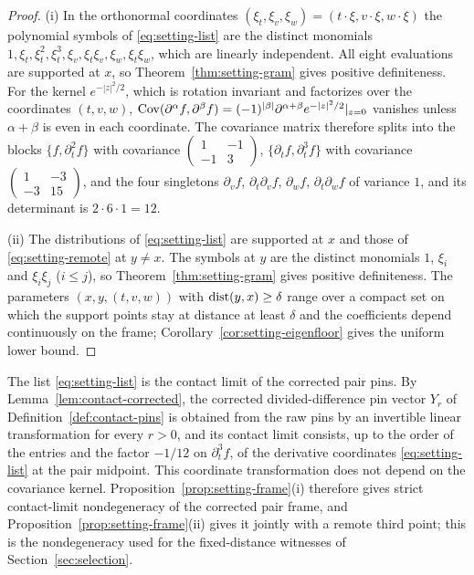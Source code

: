 \begin{proof}
(i) In the orthonormal coordinates $(\xi_t,\xi_v,\xi_w)=(t\cdot\xi,v\cdot\xi,w\cdot\xi)$ the polynomial symbols of \eqref{eq:setting-list} are the distinct monomials $1,\xi_t,\xi_t^2,\xi_t^3,\xi_v,\xi_t\xi_v,\xi_w,\xi_t\xi_w$, which are linearly independent. All eight evaluations are supported at $x$, so Theorem~\ref{thm:setting-gram} gives positive definiteness. For the kernel $e^{-|z|^2/2}$, which is rotation invariant and factorizes over the coordinates $(t,v,w)$, $\operatorname{Cov}(\partial^\alpha f,\partial^\beta f)=(-1)^{|\beta|}\partial^{\alpha+\beta}e^{-|z|^2/2}|_{z=0}$ vanishes unless $\alpha+\beta$ is even in each coordinate. The covariance matrix therefore splits into the blocks $\{f,\partial_t^2f\}$ with covariance $\left(\begin{smallmatrix}1&-1\\-1&3\end{smallmatrix}\right)$, $\{\partial_tf,\partial_t^3f\}$ with covariance $\left(\begin{smallmatrix}1&-3\\-3&15\end{smallmatrix}\right)$, and the four singletons $\partial_vf$, $\partial_t\partial_vf$, $\partial_wf$, $\partial_t\partial_wf$ of variance $1$, and its determinant is $2\cdot6\cdot1=12$.

(ii) The distributions of \eqref{eq:setting-list} are supported at $x$ and those of \eqref{eq:setting-remote} at $y\ne x$. The symbols at $y$ are the distinct monomials $1$, $\xi_i$ and $\xi_i\xi_j$ ($i\le j$), so Theorem~\ref{thm:setting-gram} gives positive definiteness. The parameters $(x,y,(t,v,w))$ with $\operatorname{dist}(y,x)\ge\delta$ range over a compact set on which the support points stay at distance at least $\delta$ and the coefficients depend continuously on the frame; Corollary~\ref{cor:setting-eigenfloor} gives the uniform lower bound.
\end{proof}

The list \eqref{eq:setting-list} is the contact limit of the corrected pair pins. By Lemma~\ref{lem:contact-corrected}, the corrected divided-difference pin vector $Y_r$ of Definition~\ref{def:contact-pins} is obtained from the raw pins by an invertible linear transformation for every $r>0$, and its contact limit consists, up to the order of the entries and the factor $-1/12$ on $\partial_t^3f$, of the derivative coordinates \eqref{eq:setting-list} at the pair midpoint. This coordinate transformation does not depend on the covariance kernel. Proposition~\ref{prop:setting-frame}(i) therefore gives strict contact-limit nondegeneracy of the corrected pair frame, and Proposition~\ref{prop:setting-frame}(ii) gives it jointly with a remote third point; this is the nondegeneracy used for the fixed-distance witnesses of Section~\ref{sec:selection}.

